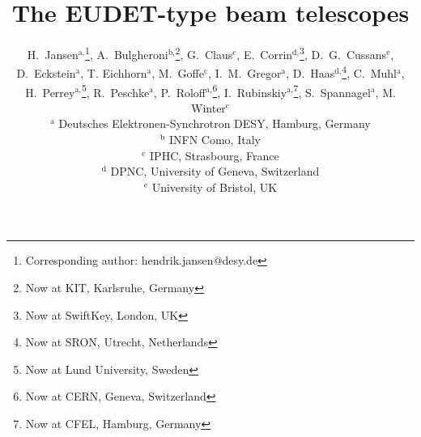 \documentclass[a4paper,10pt]{article}
\makeatletter
\renewcommand{\maketitle}{\bgroup\setlength{\parindent}{0pt}
\begin{flushleft}
  \vspace*{10mm}
  \textbf{\huge\sffamily\@title}
  \vspace{5mm}
   
  \large \@author
\end{flushleft}\egroup
}
\makeatother
\begin{document}
\linenumbers








\title{The EUDET-type beam telescopes}
\author{
H.~Jansen${}^{\textrm{a,}}$\footnote[*]{Corresponding author: hendrik.jansen@desy.de},
A.~Bulgheroni${}^{\textrm{b,}}$\footnote{Now at KIT, Karlsruhe, Germany},
G.~Claus${}^{\textrm{c}}$,
E.~Corrin${}^{\textrm{d,}}$\footnote{Now at SwiftKey, London, UK},
D.~G.~Cussans${}^{\textrm{e}}$,
D.~Eckstein${}^{\textrm{a}}$, 
T. Eichhorn${}^{\textrm{a}}$, 
M.~Goffe${}^{\textrm{c}}$,
I.~M.~Gregor${}^{\textrm{a}}$, 
D.~Haas${}^{\textrm{d,}}$\footnote{Now at SRON, Utrecht, Netherlands},
C.~Muhl${}^{\textrm{a}}$,
H.~Perrey${}^{\textrm{a,}}$\footnote{Now at Lund University, Sweden}, 
R.~Peschke${}^{\textrm{a}}$, 
P.~Roloff${}^{\textrm{a,}}$\footnote{Now at CERN, Geneva, Switzerland}, 
I.~Rubinskiy${}^{\textrm{a,}}$\footnote{Now at CFEL, Hamburg, Germany}, 
S.~Spannagel${}^{\textrm{a}}$, 
M. Winter${}^{\textrm{c}}$\\
\vspace{3mm}
${}^{\textrm{a}}$ Deutsches Elektronen-Synchrotron DESY, Hamburg, Germany\\
${}^{\textrm{b}}$ INFN Como, Italy\\
${}^{\textrm{c}}$ IPHC, Strasbourg, France\\
${}^{\textrm{d}}$ DPNC, University of Geneva, Switzerland\\
${}^{\textrm{e}}$ University of Bristol, UK
}
\maketitle
\end{document}
